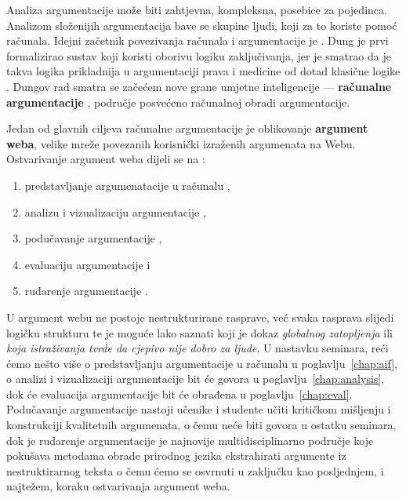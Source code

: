 Analiza argumentacije može biti zahtjevna, kompleksna, posebice
za pojedinca. Analizom složenijih argumentacija bave se skupine ljudi,
koji za to koriste pomoć računala. 
Idejni začetnik povezivanja računala i argumentacije je 
\cite{dung1995acceptability}. Dung je prvi formalizirao sustav koji 
koristi oborivu  logiku zaključivanja, jer je smatrao da 
je takva logika prikladnija u argumentaciji prava i medicine
od dotad klasične logike . 
Dungov rad smatra se začećem nove grane umjetne inteligencije ---
\textbf{računalne argumentacije} , područje 
posvećeno računalnoj obradi argumentacije. 

Jedan od glavnih ciljeva računalne argumentacije je oblikovanje 
\textbf{argument weba}, velike mreže povezanih 
korisnički izraženih argumenata na Webu. Ostvarivanje argument weba 
dijeli se na \citep{Chris2017-REETAW}:
\begin{enumerate}
    \item predstavljanje argumenatacije u računalu ,
    \item analizu i vizualizaciju argumentacije ,
    \item podučavanje argumentacije ,
    \item evaluaciju argumentacije  i
    \item rudarenje argumentacije . 
\end{enumerate}
U argument webu ne postoje nestrukturirane rasprave, već
svaka rasprava slijedi logičku strukturu te je moguće
lako saznati koji je dokaz \emph{globalnog zatopljenja} ili
\emph{koja istraživanja tvrde da cjepivo nije dobro za ljude}.
U nastavku seminara, reći ćemo nešto više o predstavljanju 
argumentacije u računalu u poglavlju~\ref{chap:aif}, 
o analizi i vizualizaciji argumentacije bit će 
govora u poglavlju~\ref{chap:analysis}, dok će evaluacija argumentacije 
bit će obrađena u poglavlju~\ref{chap:eval}. 
Podučavanje argumentacije nastoji učenike i studente učiti kritičkom 
mišljenju i konstrukciji kvalitetnih argumenata, o čemu neće biti 
govora u ostatku seminara, dok je
rudarenje argumentacije je najnovije multidisciplinarno područje 
koje pokušava metodama obrade prirodnog jezika 
ekstrahirati argumente iz nestruktirarnog teksta
o čemu ćemo se osvrnuti u zaključku kao
posljednjem, i najtežem, koraku ostvarivanja argument weba.

